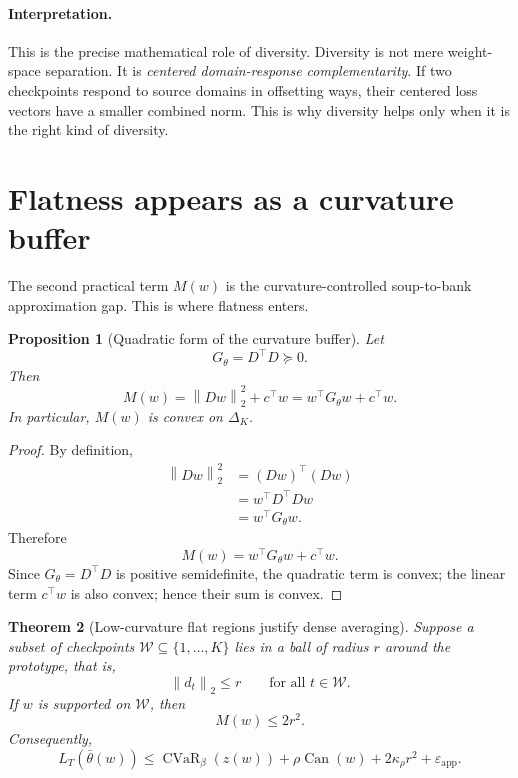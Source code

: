 \documentclass[11pt]{article}
\newcommand{\1}{\mathbf{1}}
\newcommand{\cvar}{\operatorname{CVaR}}
\newcommand{\norm}[1]{\left\lVert #1 \right\rVert}
\newcommand{\Dset}{\Delta_K}
\theoremstyle{plain}
\newtheorem{theorem}{Theorem}[section]
\newtheorem{proposition}[theorem]{Proposition}
\theoremstyle{definition}
\theoremstyle{remark}
\begin{document}
\paragraph{Interpretation.}
This is the precise mathematical role of diversity. Diversity is not mere weight-space separation. It is \emph{centered domain-response complementarity}. If two checkpoints respond to source domains in offsetting ways, their centered loss vectors have a smaller combined norm. This is why diversity helps only when it is the right kind of diversity.

\section{Flatness appears as a curvature buffer}
The second practical term $M(w)$ is the curvature-controlled soup-to-bank approximation gap. This is where flatness enters.

\begin{proposition}[Quadratic form of the curvature buffer]\label{prop:curvature_quad}
Let
\[
G_\theta = D^\top D \succeq 0.
\]
Then
\[
M(w) = \norm{Dw}_2^2 + c^\top w = w^\top G_\theta w + c^\top w.
\]
In particular, $M(w)$ is convex on $\Dset$.
\end{proposition}

\begin{proof}
By definition,
\begin{align*}
\norm{Dw}_2^2
&= (Dw)^\top (Dw) \\
&= w^\top D^\top D w \\
&= w^\top G_\theta w.
\end{align*}
Therefore
\[
M(w) = w^\top G_\theta w + c^\top w.
\]
Since $G_\theta = D^\top D$ is positive semidefinite, the quadratic term is convex; the linear term $c^\top w$ is also convex; hence their sum is convex.
\end{proof}

\begin{theorem}[Low-curvature flat regions justify dense averaging]\label{thm:flatness}
Suppose a subset of checkpoints $\mathcal{W} \subseteq \{1,\dots,K\}$ lies in a ball of radius $r$ around the prototype, that is,
\[
\norm{d_t}_2 \le r \qquad \text{for all } t \in \mathcal{W}.
\]
If $w$ is supported on $\mathcal{W}$, then
\[
M(w) \le 2r^2.
\]
Consequently,
\[
L_T(\bar\theta(w))
\le \cvar_{\beta}(z(w)) + \rho\operatorname{Can}(w) + 2\kappa_{\rho}r^2 + \varepsilon_{\mathrm{app}}.
\]
\end{theorem}
\end{document}
